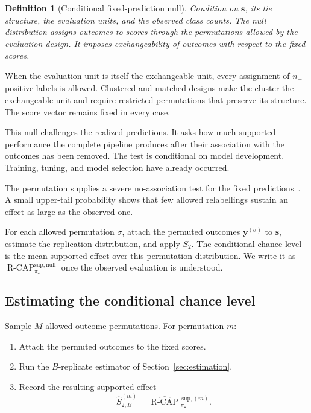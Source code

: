 \documentclass[11pt]{article}
\newcommand{\RCAPnull}{\operatorname{R\text{-}CAP}^{\mathrm{sup,null}}_{\pi_\star}}
\newtheorem{definition}{Definition}
\theoremstyle{remark}
\begin{document}
\begin{definition}[Conditional fixed-prediction null]
Condition on $\mathbf{s}$, its tie structure, the evaluation units, and the observed class counts. The null distribution assigns outcomes to scores through the permutations allowed by the evaluation design. It imposes exchangeability of outcomes with respect to the fixed scores.
\end{definition}

When the evaluation unit is itself the exchangeable unit, every assignment of $n_+$ positive labels is allowed. Clustered and matched designs make the cluster the exchangeable unit and require restricted permutations that preserve its structure. The score vector remains fixed in every case.

This null challenges the realized predictions. It asks how much supported performance the complete pipeline produces after their association with the outcomes has been removed. The test is conditional on model development. Training, tuning, and model selection have already occurred.

The permutation supplies a severe no-association test for the fixed predictions~\cite{mayo1996error,ojala2010permutation}. A small upper-tail probability shows that few allowed relabellings sustain an effect as large as the observed one.

For each allowed permutation $\sigma$, attach the permuted outcomes $\mathbf{y}^{(\sigma)}$ to $\mathbf{s}$, estimate the replication distribution, and apply $S_2$. The conditional chance level is the mean supported effect over this permutation distribution. We write it as $\RCAPnull$ once the observed evaluation is understood.

\subsection{Estimating the conditional chance level}

Sample $M$ allowed outcome permutations. For permutation $m$:
\begin{enumerate}
\item Attach the permuted outcomes to the fixed scores.
\item Run the $B$-replicate estimator of Section~\ref{sec:estimation}.
\item Record the resulting supported effect
\[
\widehat S_{2,B}^{(m)}
=
\widehat{\operatorname{R\text{-}CAP}}{}^{\,\mathrm{sup},(m)}_{\pi_\star}.
\]
\end{enumerate}
\end{document}
